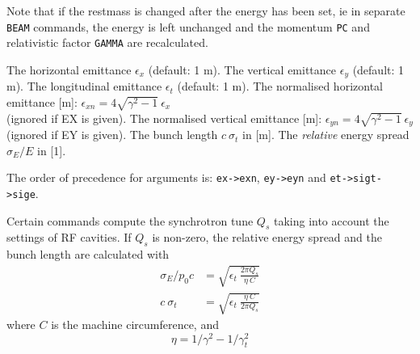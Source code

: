 Note that if the restmass is changed after the energy has been set, ie
in separate {\tt BEAM} commands, the energy is left unchanged and the momentum
{\tt PC} and relativistic factor {\tt GAMMA} are recalculated. 
\\

\begin{madlist}
   The horizontal emittance $\epsilon_x$ (default: 1 m). 
   The vertical emittance $\epsilon_y$ (default: 1 m). 
   The longitudinal emittance $\epsilon_t$ (default: 1 m). 
   The normalised horizontal emittance [m]:
  $\epsilon_{xn} = 4 \sqrt{\gamma^2 - 1} \ \epsilon_x$ \\ 
  (ignored if EX is given).  
   The normalised vertical emittance [m]:
  $\epsilon_{yn} = 4 \sqrt{\gamma^2 - 1} \ \epsilon_y$ \\ 
  (ignored if EY is given).  
   The bunch length $c\ \sigma_t$ in [m].  
   The \emph{relative} energy spread
  $\sigma_E / E$ in [1].  
\end{madlist} 

The order of precedence for arguments is: {\tt ex->exn}, {\tt ey->eyn} and
{\tt et->sigt->sige}.



Certain commands compute the synchrotron tune $Q_s$ taking into account
the settings of RF cavities. 
If $Q_s$ is non-zero, the relative energy spread and 
the bunch length are calculated with
\begin{align}
    \sigma_E / p_0 c  &=  \sqrt{\epsilon_t\ \frac{2 \pi Q_s}{\eta\ C}} \\
          c\ \sigma_t &= \sqrt{\epsilon_t\ \frac{\eta\ C}{2 \pi Q_s}}
\end{align}
where $C$ is the machine circumference, and 
\begin{equation}
  \eta = 1/\gamma^2 - 1/\gamma_t^2  
\end{equation}

